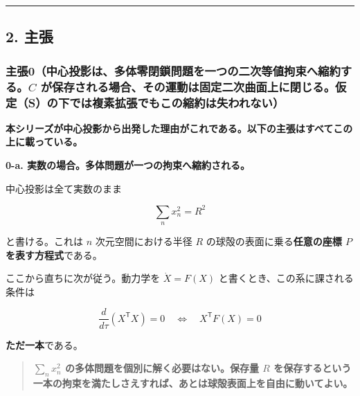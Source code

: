 \documentclass[
  10pt,
]{ltjsarticle}
\begin{document}
\begin{center}\rule{0.5\linewidth}{0.5pt}\end{center}

\subsection{2. 主張}\label{ux4e3bux5f35}

\subsubsection{\texorpdfstring{主張0（中心投影は、多体零閉鎖問題を一つの二次等値拘束へ縮約する。\(C\)
が保存される場合、その運動は固定二次曲面上に閉じる。\textbf{仮定（S）の下では}複素拡張でもこの縮約は失われない）}{主張0（中心投影は、多体零閉鎖問題を一つの二次等値拘束へ縮約する。C が保存される場合、その運動は固定二次曲面上に閉じる。仮定（S）の下では複素拡張でもこの縮約は失われない）}}\label{ux4e3bux5f350ux4e2dux5fc3ux6295ux5f71ux306fux591aux4f53ux96f6ux9589ux9396ux554fux984cux3092ux4e00ux3064ux306eux4e8cux6b21ux7b49ux5024ux62d8ux675fux3078ux7e2eux7d04ux3059ux308bc-ux304cux4fddux5b58ux3055ux308cux308bux5834ux5408ux305dux306eux904bux52d5ux306fux56faux5b9aux4e8cux6b21ux66f2ux9762ux4e0aux306bux9589ux3058ux308bux4eeeux5b9asux306eux4e0bux3067ux306fux8907ux7d20ux62e1ux5f35ux3067ux3082ux3053ux306eux7e2eux7d04ux306fux5931ux308fux308cux306aux3044}

\textbf{本シリーズが中心投影から出発した理由がこれである。以下の主張はすべてこの上に載っている。}

\textbf{0-a. 実数の場合。多体問題が一つの拘束へ縮約される。}

中心投影は全て実数のまま

\[\sum_n x_n^2 = R^2\]

と書ける。これは \(n\) 次元空間における半径 \(R\)
の球殻の表面に乗る\textbf{任意の座標 \(P\) を表す方程式}である。

ここから直ちに次が従う。動力学を \(\dot X = F(X)\)
と書くとき、この系に課される条件は

\[\frac{d}{d\tau}\left(X^{\mathsf T}X\right) = 0 \quad\Longleftrightarrow\quad X^{\mathsf T}F(X) = 0\]

\textbf{ただ一本}である。

\begin{quote}
\textbf{\(\sum_n x_n^2\) の多体問題を個別に解く必要はない。保存量 \(R\)
を保存するという一本の拘束を満たしさえすれば、あとは球殻表面上を自由に動いてよい。}
\end{quote}
\end{document}
